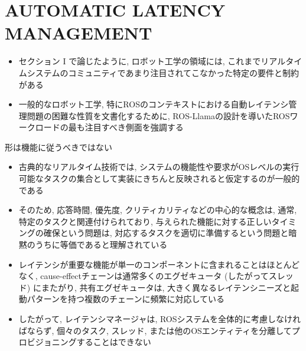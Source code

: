 
\section{AUTOMATIC LATENCY MANAGEMENT}
\label{sec: automatic latency management}

\begin{frame}{}
    \begin{itemize}
        \item セクション I で論じたように, ロボット工学の領域には, これまでリアルタイムシステムのコミュニティであまり注目されてこなかった特定の要件と制約がある
        \item 一般的なロボット工学, 特にROSのコンテキストにおける自動レイテンシ管理問題の困難な性質を文書化するために, ROS-Llamaの設計を導いたROSワークロードの最も注目すべき側面を強調する
    \end{itemize}
\end{frame}

\begin{frame}{形は機能に従うべきではない}
    \begin{itemize}
        \item 古典的なリアルタイム技術では, システムの機能性や要求がOSレベルの実行可能なタスクの集合として実装にきちんと反映されると仮定するのが一般的である
        \item そのため, 応答時間, 優先度, クリティカリティなどの中心的な概念は, 通常, 特定のタスクと関連付けられており, 与えられた機能に対する正しいタイミングの確保という問題は, 対応するタスクを適切に準備するという問題と暗黙のうちに等価であると理解されている
    \end{itemize}
\end{frame}

\begin{frame}{}
    \begin{itemize}
        \item レイテンシが重要な機能が単一のコンポーネントに含まれることはほとんどなく, cause-effectチェーンは通常多くのエグゼキュータ (したがってスレッド) にまたがり, 共有エグゼキュータは, 大きく異なるレイテンシニーズと起動パターンを持つ複数のチェーンに頻繁に対応している
        \item したがって, レイテンシマネージャは, ROSシステムを全体的に考慮しなければならず, 個々のタスク, スレッド, または他のOSエンティティを分離してプロビジョニングすることはできない
    \end{itemize}
\end{frame}

